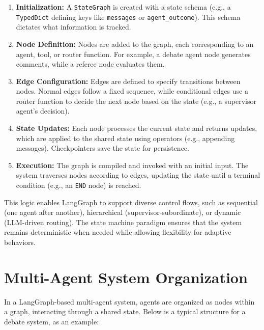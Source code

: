 \documentclass{article}
\begin{document}
\begin{enumerate}
    \item \textbf{Initialization:} A \texttt{StateGraph} is created with a state schema (e.g., a \texttt{TypedDict} defining keys like \texttt{messages} or \texttt{agent\_outcome}). This schema dictates what information is tracked.
    \item \textbf{Node Definition:} Nodes are added to the graph, each corresponding to an agent, tool, or router function. For example, a debate agent node generates comments, while a referee node evaluates them.
    \item \textbf{Edge Configuration:} Edges are defined to specify transitions between nodes. Normal edges follow a fixed sequence, while conditional edges use a router function to decide the next node based on the state (e.g., a supervisor agent’s decision).
    \item \textbf{State Updates:} Each node processes the current state and returns updates, which are applied to the shared state using operators (e.g., appending messages). Checkpointers save the state for persistence.
    \item \textbf{Execution:} The graph is compiled and invoked with an initial input. The system traverses nodes according to edges, updating the state until a terminal condition (e.g., an \texttt{END} node) is reached.
\end{enumerate}

This logic enables LangGraph to support diverse control flows, such as sequential (one agent after another), hierarchical (supervisor-subordinate), or dynamic (LLM-driven routing). The state machine paradigm ensures that the system remains deterministic when needed while allowing flexibility for adaptive behaviors.

\section{Multi-Agent System Organization}

In a LangGraph-based multi-agent system, agents are organized as nodes within a graph, interacting through a shared state. Below is a typical structure for a debate system, as an example:
\end{document}
